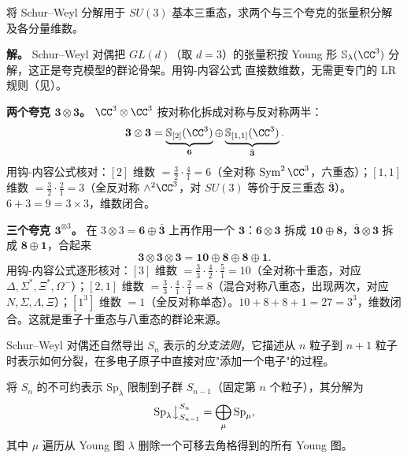 \begin{example}
将 Schur--Weyl 分解用于 $SU(3)$ 基本三重态，求两个与三个夸克的张量积分解及各分量维数。

\textbf{解。} Schur--Weyl 对偶把 $GL(d)$（取 $d=3$）的张量积按 Young 形 $\mathbb{S}_\lambda(\CC^3)$ 分解，这正是夸克模型的群论骨架。用钩-内容公式  直接数维数，无需更专门的 LR 规则（见）。

\textbf{两个夸克 $\mathbf 3\otimes\mathbf 3$。} $\CC^3\otimes\CC^3$ 按对称化拆成对称与反对称两半：
\[
\mathbf 3\otimes\mathbf 3=\underbrace{\mathbb{S}_{[2]}(\CC^3)}_{\mathbf 6}\oplus\underbrace{\mathbb{S}_{[1,1]}(\CC^3)}_{\bar{\mathbf 3}}.
\]
用钩-内容公式核对：$[2]$ 维数 $=\frac{3}{2}\cdot\frac{4}{1}=6$（全对称 $\operatorname{Sym}^2\CC^3$，六重态）；$[1,1]$ 维数 $=\frac{3}{2}\cdot\frac{2}{1}=3$（全反对称 $\wedge^2\CC^3$，对 $SU(3)$ 等价于反三重态 $\bar{\mathbf 3}$）。$6+3=9=3\times3$，维数闭合。

\textbf{三个夸克 $\mathbf 3^{\otimes3}$。} 在 $3\otimes3=\mathbf 6\oplus\bar{\mathbf 3}$ 上再作用一个 $\mathbf 3$：$\mathbf 6\otimes\mathbf 3$ 拆成 $\mathbf{10}\oplus\mathbf 8$，$\bar{\mathbf 3}\otimes\mathbf 3$ 拆成 $\mathbf 8\oplus\mathbf 1$，合起来
\[
\mathbf 3\otimes\mathbf 3\otimes\mathbf 3=\mathbf{10}\oplus\mathbf 8\oplus\mathbf 8\oplus\mathbf 1.
\]
用钩-内容公式逐形核对：$[3]$ 维数 $=\frac{3}{3}\cdot\frac{4}{2}\cdot\frac{5}{1}=10$（全对称十重态，对应 $\Delta,\Sigma^*,\Xi^*,\Omega^-$）；$[2,1]$ 维数 $=\frac{3}{3}\cdot\frac{4}{1}\cdot\frac{2}{1}=8$（混合对称八重态，出现两次，对应 $N,\Sigma,\Lambda,\Xi$）；$[1^3]$ 维数 $=1$（全反对称单态）。$10+8+8+1=27=3^3$，维数闭合。这就是重子十重态与八重态的群论来源。
\end{example}

Schur--Weyl 对偶还自然导出 $S_n$ 表示的\emph{分支法则}，它描述从 $n$ 粒子到 $n+1$ 粒子时表示如何分裂，在多电子原子中直接对应"添加一个电子"的过程。

\begin{proposition}[$S_n$ 表示的分支法则]
\label{prop:branching-rule}
将 $S_n$ 的不可约表示 $\mathrm{Sp}_\lambda$ 限制到子群 $S_{n-1}$（固定第 $n$ 个粒子），其分解为
\begin{equation}
\mathrm{Sp}_\lambda\big\downarrow_{S_{n-1}}^{S_n}
=\bigoplus_{\mu}\mathrm{Sp}_\mu,
\label{eq:sn-branching-rule}
\end{equation}
其中 $\mu$ 遍历从 Young 图 $\lambda$ 删除一个可移去角格得到的所有 Young 图。

\end{proposition}

